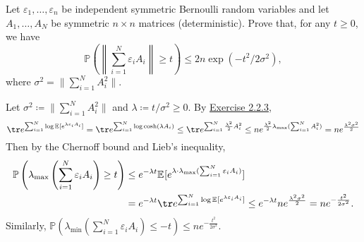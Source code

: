 \begin{problem*}[Exercise 5.4.12]\label{ex5.4.12}
	Let \(\varepsilon _1, \dots , \varepsilon _n\) be independent symmetric Bernoulli random variables and let \(A_1, \dots , A_N\) be symmetric \(n \times n\) matrices (deterministic). Prove that, for any \(t \geq 0\), we have
	\[
		\mathbb{P} \left( \left\lVert \sum_{i=1}^{N} \varepsilon _i A_i \right\rVert \geq t \right)
		\leq 2 n \exp (-t^2 / 2 \sigma ^2),
	\]
	where \(\sigma ^2 = \lVert \sum_{i=1}^{N} A_i^2 \rVert \).
\end{problem*}
\begin{answer}
	Let \(\sigma^2 \coloneqq \lVert \sum_{i=1}^{N} A_i^2 \rVert \) and \(\lambda \coloneqq t / \sigma ^2 \geq 0\). By \hyperref[ex2.2.3]{Exercise 2.2.3},
	\[
		\tr e^{\sum_{i=1}^{N} \log \mathbb{E}_{}[e^{\lambda\varepsilon_iA_i}] }
		= \tr e^{\sum_{i=1}^{N} \log\cosh(\lambda A_i)}
		\leq \tr e^{\sum_{i=1}^{N} \frac{\lambda^2}{2} A_i^2}
		\leq n e^{\frac{\lambda^2}{2} \lambda_{\max} (\sum_{i=1}^{N} A_i^2)}
		= n e^{\frac{\lambda^2\sigma^2}{2}}
	\]
	Then by the Chernoff bound and Lieb's inequality,
	\[
		\begin{split}
			\mathbb{P} \left( \lambda_{\max} \left( \sum_{i=1}^{N} \varepsilon_i A_i \right) \geq t \right)
			 & \leq e^{-\lambda t} \mathbb{E}_{}[e^{\lambda \cdot \lambda_{\max}(\sum_{i=1}^{N}\varepsilon_i A_i)}] \\
			 & = e^{-\lambda t} \tr e^{\sum_{i=1}^{N} \log \mathbb{E}_{}[e^{\lambda\varepsilon_iA_i}]}
			\leq e^{-\lambda t} n e^{\frac{\lambda^2\sigma^2}{2}}
			= n e^{-\frac{t^2}{2\sigma^2}}.
		\end{split}
	\]
	Similarly, \(\mathbb{P} (\lambda_{\min}(\sum_{i=1}^{N} \varepsilon_i A_i)\leq -t) \leq n e^{-\frac{t^2}{2\sigma^2}}\).
\end{answer}

